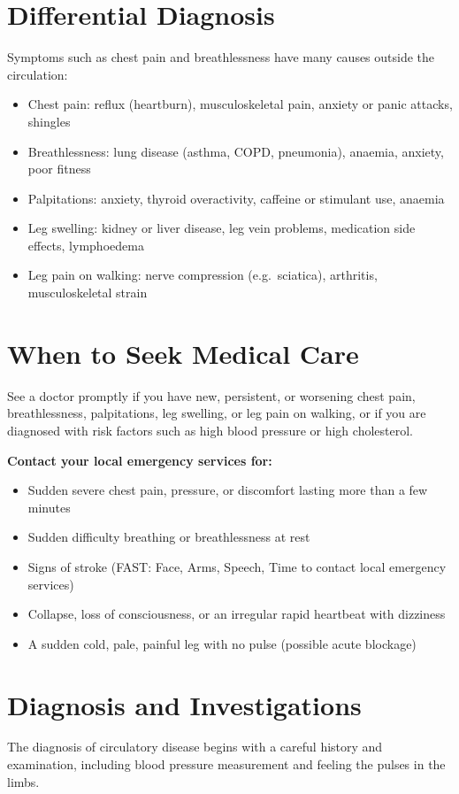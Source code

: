 \section*{Differential Diagnosis}
Symptoms such as chest pain and breathlessness have many causes outside the circulation:

\begin{itemize}
    \item Chest pain: reflux (heartburn), musculoskeletal pain, anxiety or panic attacks, shingles
    \item Breathlessness: lung disease (asthma, COPD, pneumonia), anaemia, anxiety, poor fitness
    \item Palpitations: anxiety, thyroid overactivity, caffeine or stimulant use, anaemia
    \item Leg swelling: kidney or liver disease, leg vein problems, medication side effects, lymphoedema
    \item Leg pain on walking: nerve compression (e.g.\ sciatica), arthritis, musculoskeletal strain
\end{itemize}

\section*{When to Seek Medical Care}
See a doctor promptly if you have new, persistent, or worsening chest pain, breathlessness, palpitations, leg swelling, or leg pain on walking, or if you are diagnosed with risk factors such as high blood pressure or high cholesterol.

\textbf{Contact your local emergency services for:}
\begin{itemize}
    \item Sudden severe chest pain, pressure, or discomfort lasting more than a few minutes
    \item Sudden difficulty breathing or breathlessness at rest
    \item Signs of stroke (FAST: Face, Arms, Speech, Time to contact local emergency services)
    \item Collapse, loss of consciousness, or an irregular rapid heartbeat with dizziness
    \item A sudden cold, pale, painful leg with no pulse (possible acute blockage)
\end{itemize}

\section*{Diagnosis and Investigations}
The diagnosis of circulatory disease begins with a careful history and examination, including blood pressure measurement and feeling the pulses in the limbs.

